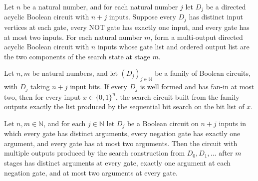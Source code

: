\begin{definition}
\label{BoolCircuit.searchCircuit}
\leanok
{}
Let $n$ be a natural number, and for each natural number $j$ let $D_j$ be a directed
acyclic Boolean circuit with $n+j$ inputs. Suppose every $D_j$ has distinct input
vertices at each gate, every NOT gate has exactly one input, and every gate has at most
two inputs. For each natural number $m$, form a multi-output directed acyclic Boolean
circuit with $n$ inputs whose gate list and ordered output list are the two components
of the search state at stage $m$.
\end{definition}

\begin{theorem}
\label{BoolCircuit.searchCircuit_eval}
\leanok
{}
Let $n,m$ be natural numbers, and let $(D_j)_{j\in\mathbb N}$ be a family of Boolean
circuits, with $D_j$ taking $n+j$ input bits. If every $D_j$ is well formed and has
fan-in at most two, then for every input $x\in\{0,1\}^n$, the search circuit built from
the family outputs exactly the list produced by the sequential bit search on the bit
list of $x$.
\end{theorem}

\begin{theorem}
\label{BoolCircuit.searchCircuit_isFaninTwo}
\leanok
{}
Let $n,m\in\mathbb{N}$, and for each $j\in\mathbb{N}$ let $D_j$ be a Boolean circuit on
$n+j$ inputs in which every gate has distinct arguments, every negation gate has exactly
one argument, and every gate has at most two arguments. Then the circuit with multiple
outputs produced by the search construction from $D_0,D_1,\ldots$ after $m$ stages has
distinct arguments at every gate, exactly one argument at each negation gate, and at
most two arguments at every gate.
\end{theorem}

